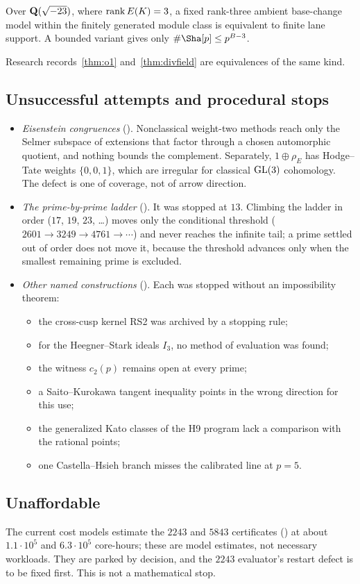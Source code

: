 \begin{researchrecord}\label{obs:stark}
Over $\mathbf{Q}(\sqrt{-23})$, where $\operatorname{rank} E(K)=3$, a fixed rank-three ambient base-change model within the finitely generated module class is equivalent to finite lane support. A bounded variant gives only $\#\Sha[p]\le p^{B-3}$.
\end{researchrecord}
Research records~\ref{thm:o1} and~\ref{thm:divfield} are equivalences of the same kind.

\subsection{Unsuccessful attempts and procedural stops}
\begin{itemize}[leftmargin=*]
\item \emph{Eisenstein congruences} (). Nonclassical weight-two methods reach only the Selmer subspace of extensions that factor through a chosen automorphic quotient, and nothing bounds the complement. Separately, $1\oplus\rho_E$ has Hodge--Tate weights $\{0,0,1\}$, which are irregular for classical $\operatorname{GL}(3)$ cohomology. The defect is one of coverage, not of arrow direction.
\item \emph{The prime-by-prime ladder} (). It was stopped at $13$. Climbing the ladder in order ($17$, $19$, $23$, \dots) moves only the conditional threshold ($2601\to3249\to4761\to\cdots$) and never reaches the infinite tail; a prime settled out of order does not move it, because the threshold advances only when the smallest remaining prime is excluded.
\item \emph{Other named constructions} (). Each was stopped without an impossibility theorem:
\begin{itemize}[leftmargin=*]
\item the cross-cusp kernel RS2 was archived by a stopping rule;
\item for the Heegner--Stark ideals $I_3$, no method of evaluation was found;
\item the witness $c_2(p)$ remains open at every prime;
\item a Saito--Kurokawa tangent inequality points in the wrong direction for this use;
\item the generalized Kato classes of the H9 program lack a comparison with the rational points;
\item one Castella--Hsieh branch misses the calibrated line at $p=5$.
\end{itemize}
\end{itemize}

\subsection{Unaffordable}
The current cost models estimate the $2243$ and $5843$ certificates () at about $1.1\cdot10^5$ and $6.3\cdot10^5$ core-hours; these are model estimates, not necessary workloads. They are parked by decision, and the $2243$ evaluator's restart defect is to be fixed first. This is not a mathematical stop.
